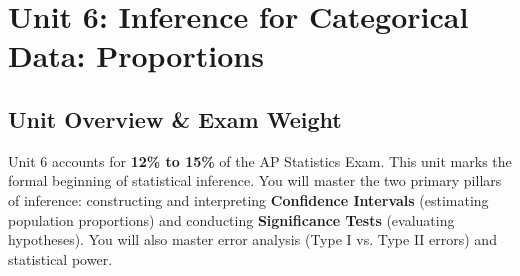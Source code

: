 ﻿%
\chapter{Unit 6: Inference for Categorical Data: Proportions}

\section{Unit Overview \& Exam Weight}
Unit 6 accounts for \textbf{12\% to 15\%} of the AP Statistics Exam. This unit marks the formal beginning of statistical inference. You will master the two primary pillars of inference: constructing and interpreting \textbf{Confidence Intervals} (estimating population proportions) and conducting \textbf{Significance Tests} (evaluating hypotheses). You will also master error analysis (Type I vs. Type II errors) and statistical power.

